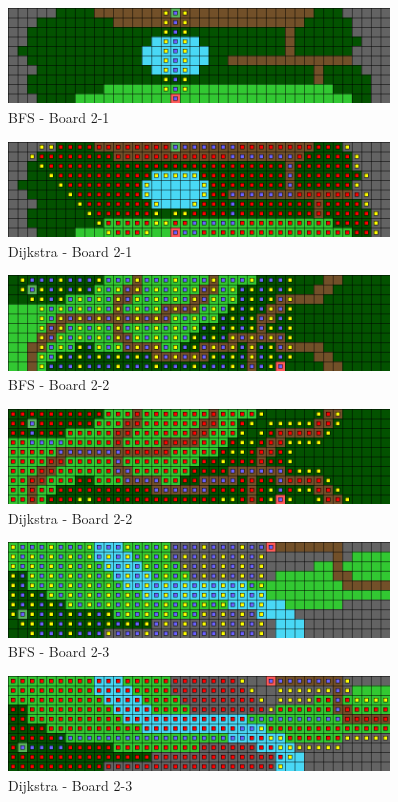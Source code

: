 \documentclass{article}
\begin{document}
	\begin{figure}[!htb]
		\caption{BFS - Board 2-1}
		\includegraphics[width=0.9\textwidth]{Bfs2-1.png}
	\end{figure}
	\begin{figure}[!htb]
		\caption{Dijkstra - Board 2-1}
		\includegraphics[width=0.9\textwidth]{Dijkstra-2-1.png}
	\end{figure}


	\begin{figure}[!htb]
		\caption{BFS - Board 2-2}
		\includegraphics[width=0.9\textwidth]{Bfs2-2.png}
	\end{figure}
	\begin{figure}[!htb]
		\caption{Dijkstra - Board 2-2}
		\includegraphics[width=0.9\textwidth]{Dijkstra-2-2.png}
	\end{figure}

	\begin{figure}[!htb]
		\caption{BFS - Board 2-3}
		\includegraphics[width=0.9\textwidth]{Bfs2-3.png}
	\end{figure}
	\begin{figure}[!htb]
		\caption{Dijkstra - Board 2-3}
		\includegraphics[width=0.9\textwidth]{Dijkstra-2-3.png}
	\end{figure}
\end{document}
